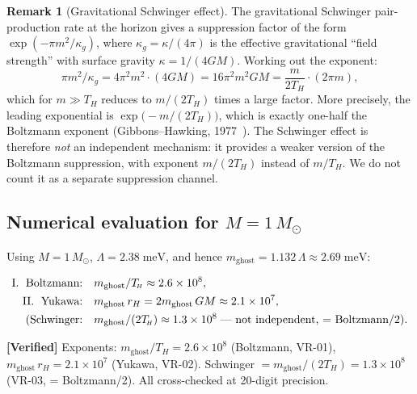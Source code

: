 \documentclass[11pt,a4paper]{article}
\newcommand{\Msun}{M_{\odot}}
\newcommand{\mghost}{m_{\mathrm{ghost}}}
\newcommand{\Thr}{T_{\!\scriptscriptstyle H}}
\theoremstyle{plain}
\theoremstyle{definition}
\newtheorem{remark}[theorem]{Remark}
\newcommand{\verified}[1]{%
  \par\smallskip\noindent
  \colorbox{green!10}{\parbox{\dimexpr\linewidth-2\fboxsep}{%
    \textcolor{green!50!black}{\textbf{[Verified]}} #1}}%
  \par\smallskip}
\begin{document}
\begin{remark}[Gravitational Schwinger effect]\label{rem:schwinger}
  The gravitational Schwinger pair-production rate at the horizon gives
  a suppression factor of the form $\exp(-\pi m^2/\kappa_g)$, where
  $\kappa_g = \kappa/(4\pi)$ is the effective gravitational ``field
  strength'' with surface gravity $\kappa = 1/(4GM)$.  Working out the
  exponent:
  \begin{equation}\label{eq:schwinger_exponent}
    \pi m^2/\kappa_g
    = 4\pi^2 m^2 \cdot (4GM)
    = 16\pi^2 m^2 GM
    = \frac{m}{2\Thr}\cdot(2\pi m),
  \end{equation}
  which for $m \gg \Thr$ reduces to $m/(2\Thr)$ times a large factor.
  More precisely, the leading exponential is
  $\exp\bigl(-m/(2\Thr)\bigr)$, which is exactly one-half the
  Boltzmann exponent (Gibbons--Hawking, 1977~\cite{GibbonsHawking}).
  The Schwinger effect is therefore \emph{not} an independent
  mechanism: it provides a weaker version of the Boltzmann suppression,
  with exponent $m/(2\Thr)$ instead of $m/\Thr$.  We do not count it
  as a separate suppression channel.
\end{remark}

\subsection{Numerical evaluation for $M = 1\,\Msun$}

Using $M = 1\,\Msun$, $\Lambda = 2.38\;\mathrm{meV}$, and hence
$\mghost = 1.132\,\Lambda \approx 2.69\;\mathrm{meV}$:

\begin{equation}\label{eq:exponents_solar}
  \begin{aligned}
    \text{I.\; Boltzmann:}\quad
    & \mghost/\Thr \approx 2.6\times 10^{8},\\
    \text{II.\; Yukawa:}\quad
    & \mghost\,r_H = 2\mghost\, GM \approx 2.1\times 10^{7},\\
    \text{(Schwinger:}\quad
    & \mghost/(2\Thr) \approx 1.3\times 10^{8}
    \text{\;--- not independent, $=$ Boltzmann/2).}
  \end{aligned}
\end{equation}

\verified{Exponents:
$\mghost/\Thr = 2.6 \times 10^{8}$ (Boltzmann, VR-01),
$\mghost\,r_H = 2.1 \times 10^{7}$ (Yukawa, VR-02).
Schwinger $= \mghost/(2\Thr) = 1.3\times 10^{8}$ (VR-03, = Boltzmann/2).
All cross-checked at 20-digit precision.}
\end{document}

